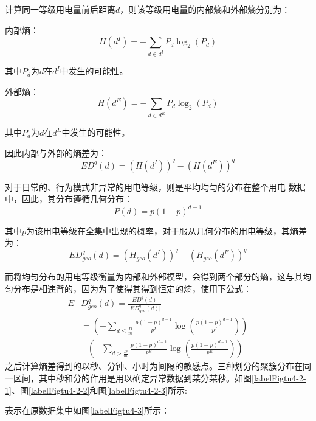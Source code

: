 \documentclass[10.5pt,twocolumn]{jbuaa}
\begin{document}
计算同一等级用电量前后距离$d$，则该等级用电量的内部熵和外部熵分别为：

内部熵：
\begin{equation}
\label{eqnLabelp4-4}
H(d^I) = -\sum_{d \in d^I} P_d \log_{2}(P_d)
\end{equation}

其中$P_d$为$d$在$d^I$中发生的可能性。

外部熵：
\begin{equation}
\label{eqnLabelp4-5}
H(d^E) = -\sum_{d \in d^E} P_d \log_{2}(P_d)
\end{equation}

其中$P_d$为$d$在$d^E$中发生的可能性。

因此内部与外部的熵差为：
\begin{equation}
\label{eqnLabelp4-6}
ED^q(d) = (H(d^I))^q - (H(d^E))^q
\end{equation}

对于日常的、行为模式非异常的用电等级，则是平均均匀的分布在整个用电
数据中，因此，其分布遵循几何分布：
\begin{equation}
\label{eqnLabelp4-7}
P(d) = p(1-p)^{d-1}
\end{equation}

其中$p$为该用电等级在全集中出现的概率，对于服从几何分布的用电等级，其熵差为：
\begin{equation}
\label{eqnLabelp4-8}
ED^{q}_{geo}(d) = (H_{geo} (d^I))^q - (H_{geo} (d^E))^q
\end{equation}

而将均匀分布的用电等级衡量为内部和外部模型，会得到两个部分的熵，这与其均匀分布是相违背的，因为为了使得其得到恒定的熵，使用下公式：
\begin{equation}
\begin{aligned}
E&D^{q}_{geo}(d) = \frac{ED^q (d)}{\vert ED^{q}_{geo}(d)\vert} \\
&= (-\sum_{d\leqslant \frac{D}{m} }\frac{p(1-p)^{d-1}}{p^I} \log(\frac{p(1-p)^{d-1}}{p^I})) \\
&-(-\sum_{d>\frac{D}{m} }\frac{p(1-p)^{d-1}}{p^E} \log(\frac{p(1-p)^{d-1}}{p^E}))
\end{aligned}
\label{eqnLabelp4-9}
\end{equation}
之后计算熵差得到的以秒、分钟、小时为间隔的敏感点。三种划分的聚簇分布在同一区间，其中秒和分的作用是用以确定异常数据到某分某秒。如图\ref{labelFigtu4-2-1}、图\ref{labelFigtu4-2-2}和图\ref{labelFigtu4-2-3}所示:

表示在原数据集中如图\ref{labelFigtu4-3}所示：
\end{document}
